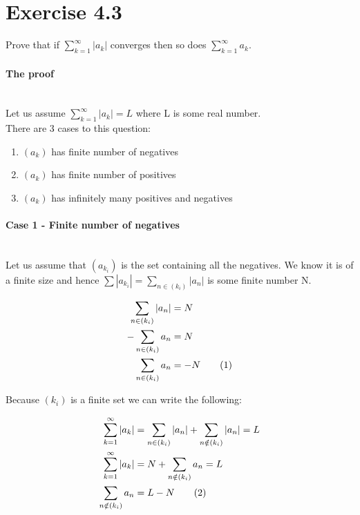 \documentclass[11pt]{article}
\begin{document}
\newcommand{\R}{\mathbb{R}}
\newcommand{\Q}{\mathbb{Q}}
\newcommand{\Z}{\mathbb{Z}}
\newcommand{\N}{\mathbb{N}}
\newcommand\numberthis{\addtocounter{equation}{1}\tag{\theequation}}

\section*{Exercise 4.3}
	
Prove that if $\sum\limits_{k=1}^{\infty}|a_k|$ converges then so does $\sum\limits_{k=1}^{\infty}a_k$.

\bigskip

\paragraph{The proof} ~\\

Let us assume $\sum\limits_{k=1}^{\infty}|a_k| = L$ where L is some real number. ~\\

There are 3 cases to this question:
\begin{enumerate}
	\item $(a_k)$ has finite number of negatives
	\item $(a_k)$ has finite number of positives
	\item $(a_k)$ has infinitely many positives and negatives
\end{enumerate} 

\paragraph{Case 1 - Finite number of negatives} ~\\

Let us assume that $(a_{k_i})$ is the set containing all the negatives. We know it is of a finite size and hence $\sum |a_{k_i}|=\sum\limits_{n \in (k_i)} |a_n|$ is some finite number N. 

\begin{align*}
\sum\limits_{n \in (k_i)} |a_n| &= N\\
-\sum\limits_{n \in (k_i)} a_n &= N\\
\sum\limits_{n \in (k_i)} a_n &= -N \numberthis \label{eq1}
\end{align*}

Because $(k_i)$ is a finite set we can write the following:

\begin{align*}
\sum\limits_{k=1}^{\infty}|a_k| &= \sum\limits_{n \in (k_i)} |a_n| + \sum\limits_{n \notin (k_i)} |a_{n}| = L\\
\sum\limits_{k=1}^{\infty}|a_k| &= N + \sum\limits_{n \notin (k_i)} a_{n} = L\\
\sum\limits_{n \notin (k_i)} a_{n} &= L - N \numberthis \label{eq2}
\end{align*}
\end{document}
